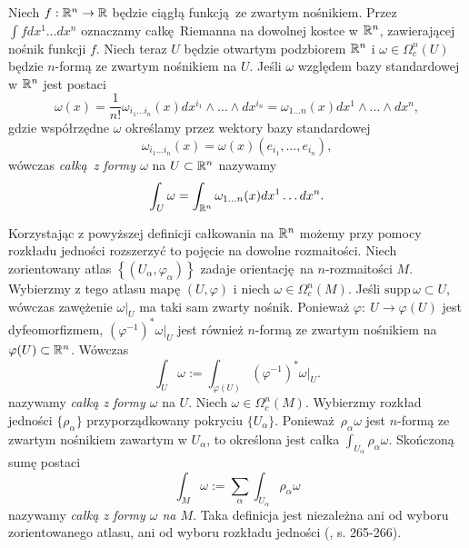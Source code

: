 Niech \(f: \mathbb{R}^n \to \mathbb{R}\) będzie ciągłą funkcją ze zwartym nośnikiem. Przez \(\int f dx^1 \dots dx^n\) oznaczamy całkę Riemanna na dowolnej kostce w \(\mathbb{R}^n\), zawierającej nośnik funkcji \(f\). Niech teraz \(U\) będzie otwartym podzbiorem \(\mathbb{R}^n\) i \(\omega\in\Omega^n_c(U)\) będzie \(n\)-formą ze zwartym nośnikiem na \(U\). Jeśli \(\omega\) względem bazy standardowej w \(\mathbb{R}^n\) jest postaci
\begin{equation*}
    \omega(x)=\frac{1}{n!} \omega_{i_1\dots i_n}(x) dx^{i_1}\wedge\dots\wedge dx^{i_n} = \omega_{1\dots n}(x)dx^1\wedge\dots\wedge dx^n,
\end{equation*}
gdzie współrzędne \(\omega\) określamy przez wektory bazy standardowej
\begin{equation*}
    \omega_{i_1\dots i_n}(x) = \omega(x)(e_{i_1}, \dots, e_{i_n}),
\end{equation*}
wówczas \emph{całką z formy \(\omega\)} na \(U\subset\mathbb{R}^n\) nazywamy
\begin{equation*}
    \int_U \omega = \int_{\mathbb{R}^n} \omega_{1\dots n}(x) dx^1\dots dx^n.
\end{equation*}

Korzystając z powyższej definicji całkowania na \(\mathbb{R}^n\) możemy przy pomocy rozkładu jedności rozszerzyć to pojęcie na dowolne rozmaitości. Niech zorientowany atlas \(\left\{(U_{\alpha}, \varphi_{\alpha})\right\}\) zadaje orientację na \(n\)-rozmaitości \(M\). Wybierzmy z tego atlasu mapę \((U, \varphi)\) i niech \(\omega\in\Omega^n_c(M)\). Jeśli \(\mathrm{supp}\,\omega \subset U\), wówczas zawężenie \(\left.\omega\right|_U\) ma taki sam zwarty nośnik. Ponieważ \(\varphi:\:U\to\varphi(U)\) jest dyfeomorfizmem, \((\varphi^{-1})^\ast\left.\omega\right|_U\) jest również \(n\)-formą ze zwartym nośnikiem na \(\varphi(U)\subset\mathbb{R}^n\). Wówczas
\begin{equation*}
    \int_U \omega := \int_{\varphi(U)} (\varphi^{-1})^{\ast}\left.\omega\right|_U.
\end{equation*}
nazywamy \emph{całką z formy \(\omega\)} na \(U\).
Niech \(\omega\in\Omega^n_c(M)\). Wybierzmy rozkład jedności \(\{\rho_{\alpha}\}\) przyporządkowany pokryciu \(\{U_{\alpha}\}\). Ponieważ \(\rho_{\alpha}\omega\) jest \(n\)-formą ze zwartym nośnikiem zawartym w \(U_{\alpha}\), to określona jest całka \(\int_{U_\alpha} \rho_{\alpha} \omega\). Skończoną sumę postaci
\begin{equation*}
    \int_M \omega := \sum_{\alpha} \int_{U_{\alpha}} \rho_{\alpha}\omega
\end{equation*}
nazywamy \emph{całką z formy \(\omega\) na \(M\)}. Taka definicja jest niezależna ani od wyboru zorientowanego atlasu, ani od wyboru rozkładu jedności (\cite{tu}, s. 265-266).

